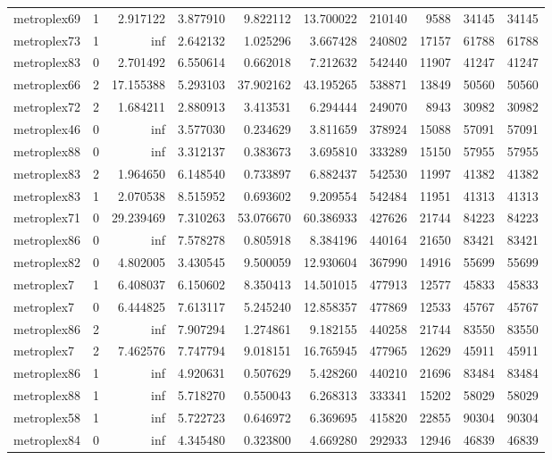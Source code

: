 \begin{longtable}{|l|r|r|r|r|r|r|r|r|r|}
metroplex69 & 1 & 2.917122 & 3.877910 & 9.822112 & 13.700022 & 210140 & 9588 & 34145 & 34145 \\
metroplex73 & 1 & inf & 2.642132 & 1.025296 & 3.667428 & 240802 & 17157 & 61788 & 61788 \\
metroplex83 & 0 & 2.701492 & 6.550614 & 0.662018 & 7.212632 & 542440 & 11907 & 41247 & 41247 \\
metroplex66 & 2 & 17.155388 & 5.293103 & 37.902162 & 43.195265 & 538871 & 13849 & 50560 & 50560 \\
metroplex72 & 2 & 1.684211 & 2.880913 & 3.413531 & 6.294444 & 249070 & 8943 & 30982 & 30982 \\
metroplex46 & 0 & inf & 3.577030 & 0.234629 & 3.811659 & 378924 & 15088 & 57091 & 57091 \\
metroplex88 & 0 & inf & 3.312137 & 0.383673 & 3.695810 & 333289 & 15150 & 57955 & 57955 \\
metroplex83 & 2 & 1.964650 & 6.148540 & 0.733897 & 6.882437 & 542530 & 11997 & 41382 & 41382 \\
metroplex83 & 1 & 2.070538 & 8.515952 & 0.693602 & 9.209554 & 542484 & 11951 & 41313 & 41313 \\
metroplex71 & 0 & 29.239469 & 7.310263 & 53.076670 & 60.386933 & 427626 & 21744 & 84223 & 84223 \\
metroplex86 & 0 & inf & 7.578278 & 0.805918 & 8.384196 & 440164 & 21650 & 83421 & 83421 \\
metroplex82 & 0 & 4.802005 & 3.430545 & 9.500059 & 12.930604 & 367990 & 14916 & 55699 & 55699 \\
metroplex7 & 1 & 6.408037 & 6.150602 & 8.350413 & 14.501015 & 477913 & 12577 & 45833 & 45833 \\
metroplex7 & 0 & 6.444825 & 7.613117 & 5.245240 & 12.858357 & 477869 & 12533 & 45767 & 45767 \\
metroplex86 & 2 & inf & 7.907294 & 1.274861 & 9.182155 & 440258 & 21744 & 83550 & 83550 \\
metroplex7 & 2 & 7.462576 & 7.747794 & 9.018151 & 16.765945 & 477965 & 12629 & 45911 & 45911 \\
metroplex86 & 1 & inf & 4.920631 & 0.507629 & 5.428260 & 440210 & 21696 & 83484 & 83484 \\
metroplex88 & 1 & inf & 5.718270 & 0.550043 & 6.268313 & 333341 & 15202 & 58029 & 58029 \\
metroplex58 & 1 & inf & 5.722723 & 0.646972 & 6.369695 & 415820 & 22855 & 90304 & 90304 \\
metroplex84 & 0 & inf & 4.345480 & 0.323800 & 4.669280 & 292933 & 12946 & 46839 & 46839 \\

\end{longtable}
